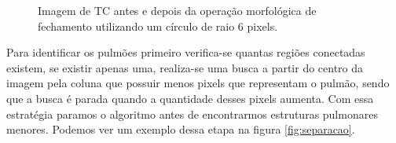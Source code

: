 \begin{figure}[ht]
 \begin{center}
 \end{center}
 \caption{Imagem de TC antes e depois da operação morfológica de fechamento utilizando um círculo de raio 6 pixels.}
 \label{fig:fechamentoAplicado}
\end{figure}

Para identificar os pulmões primeiro verifica-se quantas regiões conectadas existem, se existir apenas uma, realiza-se uma busca a partir do centro da imagem pela coluna que possuir menos pixels que representam o pulmão, sendo que a busca é parada quando a quantidade desses pixels aumenta. Com essa estratégia paramos o algoritmo antes de encontrarmos estruturas pulmonares menores. Podemos ver um exemplo dessa etapa na figura \ref{fig:separacao}.

